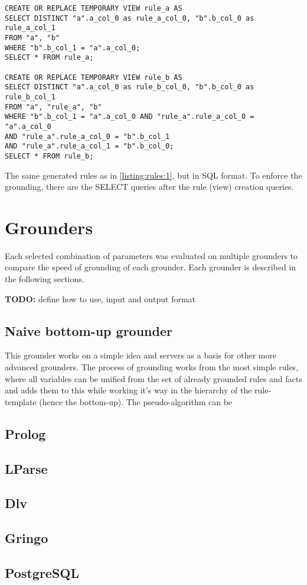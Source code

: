 \documentclass[12pt,oneside]{article}
\begin{document}
\begin{listing}
 \begin{verbatim}
CREATE OR REPLACE TEMPORARY VIEW rule_a AS
SELECT DISTINCT "a".a_col_0 as rule_a_col_0, "b".b_col_0 as rule_a_col_1
FROM "a", "b"
WHERE "b".b_col_1 = "a".a_col_0;
SELECT * FROM rule_a;

CREATE OR REPLACE TEMPORARY VIEW rule_b AS
SELECT DISTINCT "a".a_col_0 as rule_b_col_0, "b".b_col_0 as rule_b_col_1
FROM "a", "rule_a", "b"
WHERE "b".b_col_1 = "a".a_col_0 AND "rule_a".rule_a_col_0 = "a".a_col_0
AND "rule_a".rule_a_col_0 = "b".b_col_1
AND "rule_a".rule_a_col_1 = "b".b_col_0;
SELECT * FROM rule_b;
 \end{verbatim}
\caption{The same generated rules as in \ref{listing:rules:1}, but in SQL format. To enforce the
grounding, there are the SELECT queries after the rule (view) creation queries.}
\label{listing:rules:2}
\end{listing}




\section[something]{Grounders}
Each selected combination of parameters was evaluated on multiple grounders to compare the speed of
grounding of each grounder. Each grounder is described in the following sections.

\textbf{TODO:} define how to use, input and output format

\subsection{Naive bottom-up grounder}
This grounder works on a simple idea and servers as a basis for other more advanced grounders. The
process of grounding works from the most simple rules, where all variables can be unified from the
set of already grounded rules and facts and adds them to this while working it's way in the
hierarchy of the rule-template (hence the bottom-up). The pseudo-algorithm can be

\subsection{Prolog}

\subsection{LParse}

\subsection{Dlv}

\subsection{Gringo}

\subsection{PostgreSQL}



\end{document}
